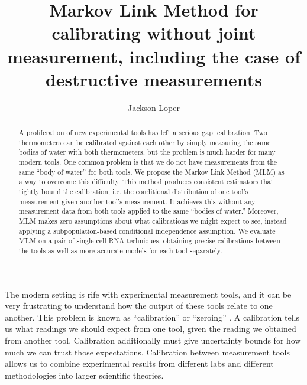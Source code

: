 



\DeclareMathOperator*{\tr}{tr}

\newcommand{\UN}[1]{\ensuremath{\left|#1\right|_\infty}}
\newcommand{\EN}[1]{\ensuremath{\left|#1\right|}}
\newcommand{\kldiv}[2]{\ensuremath{D\left(#1||#2\right)}}

\usepackage{cancel}


\title{Markov Link Method for calibrating without joint measurement, including the case of destructive measurements}
\author{Jackson Loper}

\usepackage{amsthm}
\newtheorem*{thm}{Theorem}
\newtheorem{lem}{Lemma}
\newtheorem{conj}{Conjecture}


\maketitle

\begin{abstract}
A proliferation of new experimental tools has left a serious gap: calibration. Two thermometers can be calibrated against each other by simply measuring the same bodies of water with both thermometers, but the problem is much harder for many modern tools.  One common problem is that we do not have measurements from the same ``body of water'' for both tools.  We propose the Markov Link Method (MLM) as a way to overcome this difficulty.   This method produces consistent estimators that tightly bound the calibration, i.e. the conditional distribution of one tool's measurement given another tool's measurement. It achieves this without any measurement data from both tools applied to the same ``bodies of water.'' Moreover, MLM makes zero assumptions about what calibrations we might expect to see, instead applying a subpopulation-based conditional independence assumption.   We evaluate MLM on a pair of single-cell RNA techniques, obtaining precise calibrations between the tools as well as more accurate models for each tool separately.
\end{abstract}

The modern setting is rife with experimental measurement tools, and it can be very frustrating to understand how the output of these tools relate to one another.  This problem is known as ``calibration'' or ``zeroing'' \cite{bipm2008international}.  A calibration tells us what readings we should expect from one tool, given the reading we obtained from another tool.   Calibration additionally must give uncertainty bounds for how much we can trust those expectations.  Calibration between measurement tools allows us to combine experimental results from different labs and different methodologies into larger scientific theories.  

